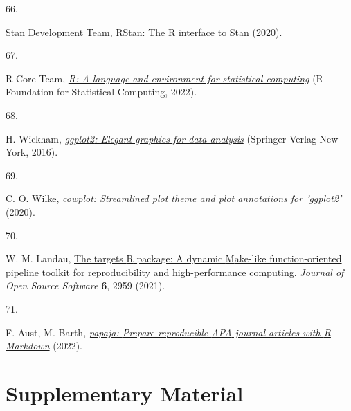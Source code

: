 \documentclass[
  man, donotrepeattitle,floatsintext]{apa6}
\newlength{\cslhangindent}
\newlength{\csllabelwidth}
\newlength{\cslentryspacingunit} %
\newenvironment{CSLReferences}[2] %
 {%
  \setlength{\parindent}{0pt}
  \ifodd #1
  \let\oldpar\par
  \def\par{\hangindent=\cslhangindent\oldpar}
  \fi
  \setlength{\parskip}{#2\cslentryspacingunit}
 }%
 {}
\newcommand{\CSLLeftMargin}[1]{\parbox[t]{\csllabelwidth}{#1}}
\newcommand{\CSLRightInline}[1]{\parbox[t]{\linewidth - \csllabelwidth}{#1}\break}
\begin{document}
\begin{CSLReferences}{0}{0}
\leavevmode{}%
\CSLLeftMargin{66. }%
\CSLRightInline{Stan Development Team, \href{http://mc-stan.org/}{{RStan}: The {R} interface to {Stan}} (2020).}

\leavevmode{}%
\CSLLeftMargin{67. }%
\CSLRightInline{R Core Team, \emph{\href{https://www.R-project.org/}{R: A language and environment for statistical computing}} (R Foundation for Statistical Computing, 2022).}

\leavevmode{}%
\CSLLeftMargin{68. }%
\CSLRightInline{H. Wickham, \emph{\href{https://ggplot2.tidyverse.org}{{ggplot2}: Elegant graphics for data analysis}} (Springer-Verlag New York, 2016).}

\leavevmode{}%
\CSLLeftMargin{69. }%
\CSLRightInline{C. O. Wilke, \emph{\href{https://CRAN.R-project.org/package=cowplot}{{cowplot}: Streamlined plot theme and plot annotations for 'ggplot2'}} (2020).}

\leavevmode{}%
\CSLLeftMargin{70. }%
\CSLRightInline{W. M. Landau, \href{https://doi.org/10.21105/joss.02959}{The targets {R} package: A dynamic {M}ake-like function-oriented pipeline toolkit for reproducibility and high-performance computing}. \emph{Journal of Open Source Software} \textbf{6}, 2959 (2021).}

\leavevmode{}%
\CSLLeftMargin{71. }%
\CSLRightInline{F. Aust, M. Barth, \emph{\href{https://github.com/crsh/papaja}{{papaja}: {Prepare} reproducible {APA} journal articles with {R Markdown}}} (2022).}

\end{CSLReferences}

\endgroup

\newpage
\vspace*{60mm}

\renewcommand{\figurename}{Supplementary Figure}
\renewcommand{\tablename}{Supplementary Table}
\renewcommand{\thefigure}{S\arabic{figure}} \setcounter{figure}{0}
\renewcommand{\thetable}{S\arabic{table}} \setcounter{table}{0}
\renewcommand{\theequation}{S\arabic{equation}} \setcounter{equation}{0}

\hypertarget{supplementary-material}{%
\section{\texorpdfstring{\textbf{Supplementary Material}}{Supplementary Material}}\label{supplementary-material}}
\end{document}
